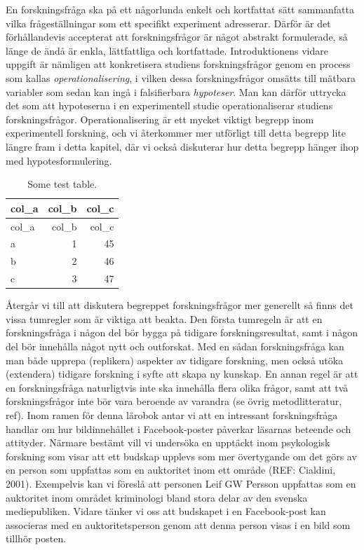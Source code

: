 \documentclass[
]{book}
\begin{document}
En forskningsfråga ska på ett någorlunda enkelt och kortfattat sätt sammanfatta vilka frågeställningar som ett specifikt experiment adresserar. Därför är det förhållandevis accepterat att forskningsfrågor är något abstrakt formulerade, så länge de ändå är enkla, lättfattliga och kortfattade. Introduktionens vidare uppgift är nämligen att konkretisera studiens forskningsfrågor genom en process som kallas \emph{operationalisering}, i vilken dessa forskningsfrågor omsätts till mätbara variabler som sedan kan ingå i falsifierbara \emph{hypoteser}. Man kan därför uttrycka det som att hypoteserna i en experimentell studie operationaliserar studiens forskningsfrågor. Operationalisering är ett mycket viktigt begrepp inom experimentell forskning, och vi återkommer mer utförligt till detta begrepp lite längre fram i detta kapitel, där vi också diskuterar hur detta begrepp hänger ihop med hypotesformulering.

\begin{longtable}[]{@{}lrr@{}}
\caption{\label{tab:tab-02-06-1-1}Some test table.}\tabularnewline
\toprule
col\_a & col\_b & col\_c\tabularnewline
\midrule
\endfirsthead
\toprule
col\_a & col\_b & col\_c\tabularnewline
\midrule
\endhead
a & 1 & 45\tabularnewline
b & 2 & 46\tabularnewline
c & 3 & 47\tabularnewline
\bottomrule
\end{longtable}

Återgår vi till att diskutera begreppet forskningsfrågor mer generellt så finns det vissa tumregler som är viktiga att beakta. Den första tumregeln är att en forskningsfråga i någon del bör bygga på tidigare forskningsresultat, samt i någon del bör innehålla något nytt och outforskat. Med en sådan forskningsfråga kan man både upprepa (replikera) aspekter av tidigare forskning, men också utöka (extendera) tidigare forskning i syfte att skapa ny kunskap. En annan regel är att en forskningsfråga naturligtvis inte ska innehålla flera olika frågor, samt att två forskningsfrågor inte bör vara beroende av varandra (se övrig metodlitteratur, ref). Inom ramen för denna lärobok antar vi att en intressant forskningsfråga handlar om hur bildinnehållet i Facebook-poster påverkar läsarnas beteende och attityder. Närmare bestämt vill vi undersöka en upptäckt inom psykologisk forskning som visar att ett budskap upplevs som mer övertygande om det görs av en person som uppfattas som en auktoritet inom ett område (REF: Cialdini, 2001). Exempelvis kan vi föreslå att personen Leif GW Persson uppfattas som en auktoritet inom området kriminologi bland stora delar av den svenska mediepubliken. Vidare tänker vi oss att budskapet i en Facebook-post kan associeras med en auktoritetsperson genom att denna person visas i en bild som tillhör posten.
\end{document}
